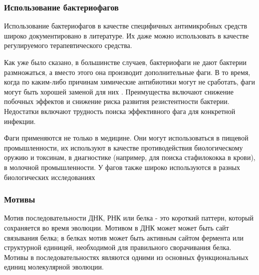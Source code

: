 \documentclass[14pt]{extarticle}
\begin{document}
    \begin{center}
    \item \subsubsection{Использование бактериофагов}
    \end{center}
    
    \par{Использование бактериофагов в качестве специфичных антимикробных средств широко документировано в 
    литературе. Их даже можно использовать в качестве регулируемого терапевтического средства.}
    
    \par{Как уже было сказано, в большинстве случаев, бактериофаги не дают бактерии размножаться, а вместо этого она 
    производит дополнительные фаги. В то время, когда по каким-либо причинам химические антибиотики 
    могут не сработать, фаги могут быть хорошей заменой для них \cite{phageapps}. Преимущества включают снижение 
    побочных эффектов и снижение риска развития резистентности бактерии. Недостатки включают трудность поиска 
    эффективного фага для конкретной инфекции. \cite{advdisphage}}
    
    \par{Фаги применяются не только в медицине. Они могут использоваться в пищевой промышленности, их 
    используют в качестве противодействия биологическому оружию и токсинам, в диагностике (например, для поиска 
    стафилококка в крови), в молочной промышленности. У фагов также широко используются в разных биологических 
    исследованиях \cite{phagewikieng}}
    
    \begin{center}
    \item \subsubsection{Мотивы}
    \end{center}
    
    \par{Мотив последовательности ДНК, РНК или белка - это короткий паттерн, который сохраняется во время эволюции. 
    Мотивом в ДНК может может быть сайт связывания белка; в белках мотив может быть активным сайтом фермента или 
    структурной единицей, необходимой для правильного сворачивания белка. Мотивы в последовательностях являются одними 
    из основных функциональных единиц молекулярной эволюции.}
    
\end{document}
